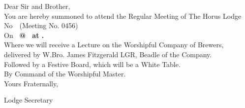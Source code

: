 \documentclass[11pt,a4paper]{article}
\providecommand{\MeetingNumber}{0456}
\begin{document}
{\HorusBodyFont
\noindent Dear Sir and Brother,\\[10pt]
You are hereby summoned to attend the Regular Meeting of The Horus Lodge No~\LodgeNumber~(Meeting No. \MeetingNumber)\\[8pt]
On \textbf{\MeetingDate\ @ \MeetingTyling\ at \MeetingVenue.}\\[10pt]
Where we will receive a Lecture on the Worshipful Company of Brewers, delivered by W.Bro. James Fitzgerald LGR, Beadle of the Company.\\[10pt]
Followed by a Festive Board, which will be a White Table.\\[10pt]
By Command of the Worshipful Master.\\[22pt]
Yours Fraternally,\\[14pt]
\begin{minipage}[t]{0.56\textwidth}
  {\SignatureNameFont 
    \if\relax\detokenize\expandafter{\SecretaryDisplayName}\relax
      \if\relax\detokenize\expandafter{\SecretaryName}\relax
      \else
        \SecretarySalutation\space\SecretaryName
      \fi
    \else
      \SecretaryDisplayName
    \fi
  }\par\vspace{2pt}
  {\SignatureRanksFont 
    \if\relax\detokenize\expandafter{\SecretaryPostnominalsOverride}\relax
      \FormatPostNominals{\SecretaryCraftGrandRank}{\SecretaryCraftRanks}{\SecretaryRAGrandRank}{\SecretaryRARanks}%
    \else
      \SecretaryPostnominalsOverride
    \fi
  }\par\vspace{2pt}
  {\SignatureRoleFont Lodge Secretary}
\end{minipage}\hfill
\begin{minipage}[t]{0.34\textwidth}\raggedleft
  {\AddressFont \SecretaryAddressLineA}\par\vspace{2pt}
  {\AddressFont \SecretaryAddressLineB}\par\vspace{2pt}
  {\AddressFont \SecretaryAddressLineC}\par\vspace{2pt}
  {\ContactFont 
    \if\relax\detokenize\expandafter{\SecretaryPhoneOverride}\relax
      \edef\PhoneVal{\SecretaryPhone}%
}
\end{minipage}}
\end{document}

